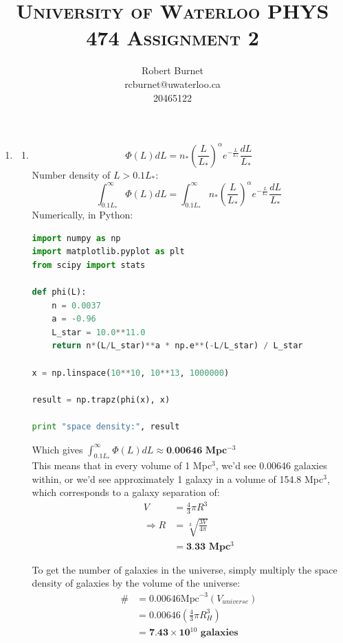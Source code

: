 \documentclass[10pt,letterpaper]{article}
\begin{document}
\title{\scshape\LARGE University of Waterloo \vfill \huge\bfseries PHYS 474 Assignment 2 \vfill}
\author{Robert Burnet \\ rcburnet@uwaterloo.ca \\ 20465122 }
\maketitle

\newpage
\begin{enumerate}
\item \begin{enumerate}
\item \begin{equation}\nonumber
\Phi (L) dL = n_* \left(\frac{L}{L_*}\right)^\alpha e^{-\frac{L}{L_*}} \frac{dL}{L_*}
\end{equation}
Number density of $L > 0.1 L_*$:
\begin{equation}\nonumber
\int_{0.1L_*}^{\infty} \Phi (L) dL = \int_{0.1L_*}^{\infty} n_* \left(\frac{L}{L_*}\right)^\alpha e^{-\frac{L}{L_*}} \frac{dL}{L_*}
\end{equation}
Numerically, in Python:
\begin{lstlisting}[language=Python]
import numpy as np
import matplotlib.pyplot as plt
from scipy import stats

def phi(L):
    n = 0.0037
    a = -0.96
    L_star = 10.0**11.0
    return n*(L/L_star)**a * np.e**(-L/L_star) / L_star

x = np.linspace(10**10, 10**13, 1000000)

result = np.trapz(phi(x), x)

print "space density:", result
\end{lstlisting}
Which gives $\int_{0.1L_*}^{\infty} \Phi (L) dL \approx \textbf{0.00646  Mpc$^{-3}$}$\\

This means that in every volume of 1 Mpc$^3$, we'd see 0.00646 galaxies within, or we'd see approximately 1 galaxy in a volume of 154.8 Mpc$^3$, which corresponds to a galaxy separation of:
\begin{equation}\nonumber
\begin{split}
V & =  \frac{4}{3} \pi R^3 \\
\Rightarrow R & = \sqrt[3]{\frac{3V}{4\pi}} \\
& = \textbf{3.33 Mpc$^3$}
\end{split}
\end{equation}

To get the number of galaxies in the universe, simply multiply the space density of galaxies by the volume of the universe:
\begin{equation}\nonumber
\begin{split}
\# & = 0.00646\text{Mpc}^{-3} (V_{universe})\\
 & = 0.00646 \left(\frac{4}{3} \pi R_H^3\right)\\
 & = \textbf{7.43$\times$10$^{10}$ galaxies}
\end{split}
\end{equation}


\end{enumerate}
\end{enumerate}
\end{document}
